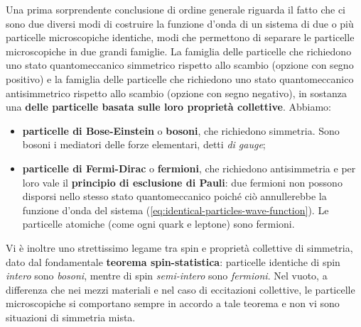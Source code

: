 Una prima sorprendente conclusione di ordine generale riguarda il fatto che ci sono due diversi modi di costruire la
funzione d’onda di un sistema di due o più particelle microscopiche identiche, modi che permettono di separare
le particelle microscopiche in due grandi famiglie.
La famiglia delle particelle che richiedono uno stato quantomeccanico simmetrico rispetto allo scambio
(opzione con segno positivo) e la famiglia delle particelle che richiedono uno stato quantomeccanico antisimmetrico
rispetto allo scambio (opzione con segno negativo), in sostanza una \textbf{ delle particelle basata sulle loro proprietà
collettive}.
Abbiamo:
\begin{itemize}
    \item \textbf{particelle di Bose-Einstein} o \textbf{bosoni}, che richiedono simmetria.
    Sono bosoni i mediatori delle forze elementari, detti \textit{di gauge};
    \item \textbf{particelle di Fermi-Dirac} o \textbf{fermioni}, che richiedono antisimmetria e per loro vale il
    \textbf{principio di esclusione di Pauli}:
    due fermioni non possono disporsi nello stesso stato quantomeccanico poiché ciò annullerebbe la funzione d'onda del sistema
    (\ref{eq:identical-particles-wave-function}).
    Le particelle atomiche (come ogni quark e leptone) sono fermioni.
\end{itemize}
Vi è inoltre uno strettissimo legame tra spin e proprietà collettive di simmetria, dato dal fondamentale \textbf{teorema spin-statistica}:
particelle identiche di spin \textit{intero} sono \textit{bosoni}, mentre di spin \textit{semi-intero} sono \textit{fermioni}.
Nel vuoto, a differenza che nei mezzi materiali e nel caso di eccitazioni collettive, le particelle microscopiche si
comportano sempre in accordo a tale teorema e non vi sono situazioni di simmetria mista.